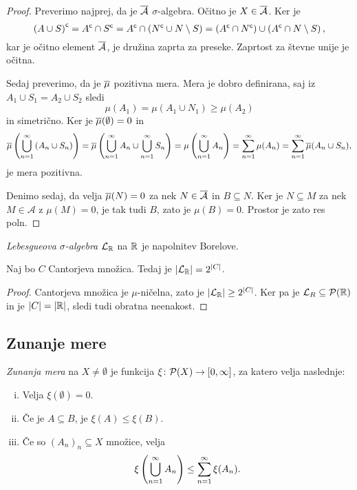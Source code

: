 \begin{proof}
Preverimo najprej, da je $\overline{\mathcal{A}}$ $\sigma$-algebra.
Očitno je $X \in \overline{\mathcal{A}}$. Ker je
\[
\left(A \cup S\right)^{\mathsf{c}} =
A^{\mathsf{c}} \cap S^{\mathsf{c}} =
A^{\mathsf{c}} \cap \left(N^{\mathsf{c}} \cup N \setminus S\right) =
\left(A^{\mathsf{c}} \cap N^{\mathsf{c}}\right) \cup
\left(A^{\mathsf{c}} \cap N \setminus S\right),
\]
kar je očitno element $\overline{\mathcal{A}}$, je družina zaprta za
preseke. Zaprtost za števne unije je očitna.

Sedaj preverimo, da je $\overline{\mu}$ pozitivna mera. Mera je dobro
definirana, saj iz $A_1 \cup S_1 = A_2 \cup S_2$ sledi
\[
\mu(A_1) = \mu(A_1 \cup N_1) \geq \mu(A_2)
\]
in simetrično. Ker je
$\overline{\mu}(\emptyset) = 0$ in
\[
\overline{\mu} \left(\bigcup_{n=1}^\infty \left(A_n \cup S_n\right)\right) =
\overline{\mu} \left(\bigcup_{n=1}^\infty A_n \cup
\bigcup_{n=1}^\infty S_n\right) =
\mu \left(\bigcup_{n=1}^\infty A_n\right) =
\sum_{n=1}^\infty \mu(A_n) =
\sum_{n=1}^\infty \overline{\mu}(A_n \cup S_n),
\]
je mera pozitivna.

Denimo sedaj, da velja $\overline{\mu}(N) = 0$ za nek
$N \in \overline{\mathcal{A}}$ in $B \subseteq N$. Ker je
$N \subseteq M$ za nek $M \in \mathcal{A}$ z $\mu(M) = 0$, je tak
tudi $B$, zato je $\mu(B) = 0$. Prostor je zato res poln.
\end{proof}

\begin{definicija}
\emph{Lebesgueova $\sigma$-algebra}
$\mathcal{L}_{\mathbb{R}}$ na $\mathbb{R}$ je napolnitev Borelove.
\end{definicija}

\begin{izrek}
Naj bo $C$ Cantorjeva množica. Tedaj je
$\left\lvert \mathcal{L}_{\mathbb{R}}\right\rvert = 2^{\left\lvert C\right\rvert}$.
\end{izrek}

\begin{proof}
Cantorjeva množica je $\mu$-ničelna, zato je
$\left\lvert \mathcal{L}_{\mathbb{R}}\right\rvert \geq 2^{\left\lvert C\right\rvert}$. Ker pa je
$\mathcal{L}_R \subseteq \mathcal{P}(\mathbb{R})$ in je
$\left\lvert C\right\rvert = \left\lvert \mathbb{R}\right\rvert$, sledi
tudi obratna neenakost.
\end{proof}

\newpage

\subsection{Zunanje mere}

\begin{definicija}
\emph{Zunanja mera} na $X \ne \emptyset$ je
funkcija $\xi \colon \mathcal{P}(X) \to [0, \infty]$, za katero velja
naslednje:

\begin{enumerate}[i)]
\item Velja $\xi(\emptyset) = 0$.
\item Če je $A \subseteq B$, je $\xi(A) \leq \xi(B)$.
\item Če so $(A_n)_n \subseteq X$ množice, velja
\[
\xi \left(\bigcup_{n=1}^\infty A_n\right) \leq
\sum_{n=1}^\infty \xi(A_n).
\]
\end{enumerate}
\end{definicija}

